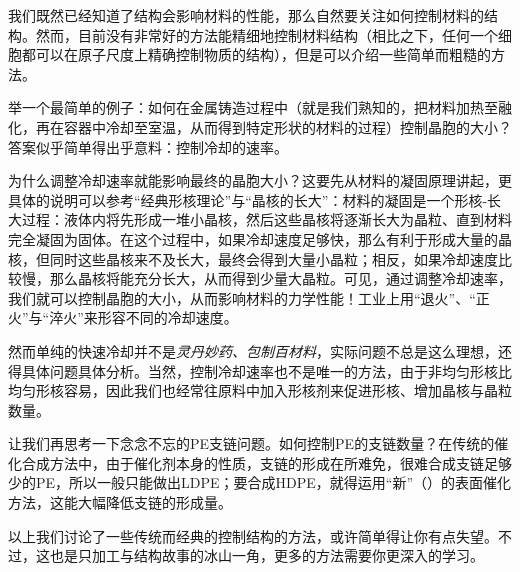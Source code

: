 我们既然已经知道了结构会影响材料的性能，那么自然要关注如何控制材料的结构。然而，目前没有非常好的方法能精细地控制材料结构（相比之下，任何一个细胞都可以在原子尺度上精确控制物质的结构），但是可以介绍一些简单而粗糙的方法。

举一个最简单的例子：如何在金属铸造过程中（就是我们熟知的，把材料加热至融化，再在容器中冷却至室温，从而得到特定形状的材料的过程）控制晶胞的大小？答案似乎简单得出乎意料：控制冷却的速率。

为什么调整冷却速率就能影响最终的晶胞大小？这要先从材料的凝固原理讲起，更具体的说明可以参考“经典形核理论”与“晶核的长大”：材料的凝固是一个形核-长大过程：液体内将先形成一堆小晶核，然后这些晶核将逐渐长大为晶粒、直到材料完全凝固为固体。在这个过程中，如果冷却速度足够快，那么有利于形成大量的晶核，但同时这些晶核来不及长大，最终会得到大量小晶粒；相反，如果冷却速度比较慢，那么晶核将能充分长大，从而得到少量大晶粒。可见，通过调整冷却速率，我们就可以控制晶胞的大小，从而影响材料的力学性能！工业上用“退火”、“正火”与“淬火”来形容不同的冷却速度。

然而单纯的快速冷却并不是\textsl{灵丹妙药、包制百材料}，实际问题不总是这么理想，还得具体问题具体分析。当然，控制冷却速率也不是唯一的方法，由于非均匀形核比均匀形核容易，因此我们也经常往原料中加入形核剂来促进形核、增加晶核与晶粒数量。


让我们再思考一下念念不忘的PE支链问题。如何控制PE的支链数量？在传统的催化合成方法中，由于催化剂本身的性质，支链的形成在所难免，很难合成支链足够少的PE，所以一般只能做出LDPE；要合成HDPE，就得运用“新”（）的表面催化方法，这能大幅降低支链的形成量。

以上我们讨论了一些传统而经典的控制结构的方法，或许简单得让你有点失望。不过，这也是只加工与结构故事的冰山一角，更多的方法需要你更深入的学习。


